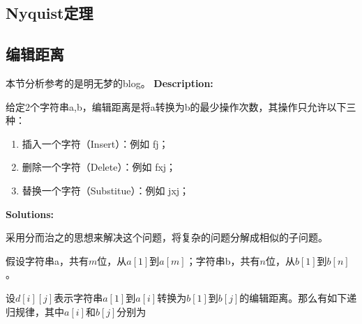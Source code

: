 \subsection{Nyquist定理}

\subsection{编辑距离}
\label{sub:edit-distance}
本节分析参考的是明无梦的blog。
{\bf Description:}

给定2个字符串a,b，编辑距离是将a转换为b的最少操作次数，其操作只允许以下三种：
\begin{enumerate}
  \item 插入一个字符（Insert）：例如 fj；
  \item 删除一个字符（Delete）：例如 fxj；
  \item 替换一个字符（Substitue）：例如 jxj；
\end{enumerate}

{\bf Solutions:}

采用分而治之的思想来解决这个问题，将复杂的问题分解成相似的子问题。

假设字符串a，共有$m$位，从$a[1]$到$a[m]$；字符串b，共有$n$位，从$b[1]$到$b[n]$。

设$d[i][j]$表示字符串$a[1]$到$a[i]$转换为$b[1]$到$b[j]$的编辑距离。那么有如下递归规律，其中$a[i]$和$b[j]$分别为






















